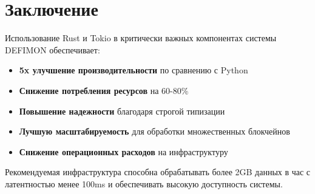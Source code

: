 \documentclass[11pt,a4paper]{article}
\begin{document}
\section{Заключение}

Использование Rust и Tokio в критически важных компонентах системы DEFIMON обеспечивает:

\begin{itemize}
    \item \textbf{5x улучшение производительности} по сравнению с Python
    \item \textbf{Снижение потребления ресурсов} на 60-80\%
    \item \textbf{Повышение надежности} благодаря строгой типизации
    \item \textbf{Лучшую масштабируемость} для обработки множественных блокчейнов
    \item \textbf{Снижение операционных расходов} на инфраструктуру
\end{itemize}

Рекомендуемая инфраструктура способна обрабатывать более 2GB данных в час с латентностью менее 100ms и обеспечивать высокую доступность системы.
\end{document}
